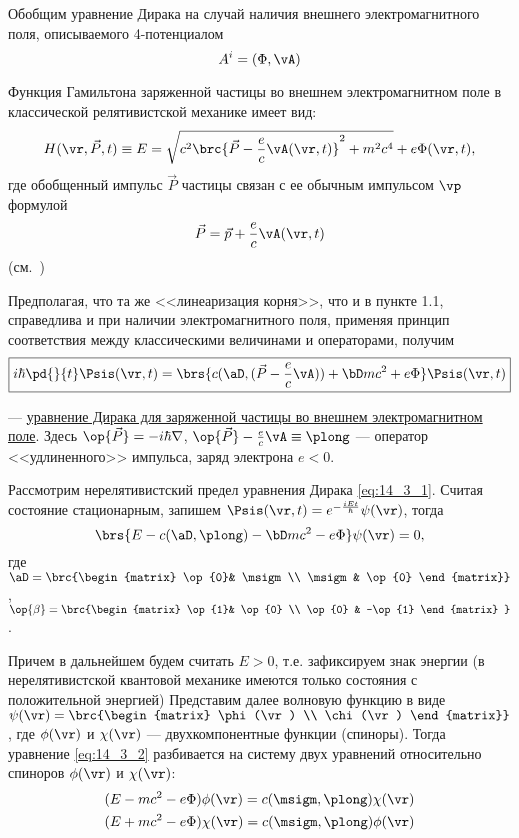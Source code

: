 Обобщим уравнение Дирака на случай наличия внешнего электромагнитного поля, описываемого 4-потенциалом
$$
A^i=(\Phi, \vA)
$$

Функция Гамильтона заряженной частицы во внешнем электромагнитном поле в классической релятивистской механике имеет вид:
$$
H(\vr, \vec{P}, t) \equiv E = \sqrt{c^2\brc{\vec{P} - \frac{e}{c}\vA(\vr, t)}^2 + m^2c^4} + e\Phi(\vr, t),
$$
где обобщенный импульс $\vec{P}$ частицы связан с ее обычным импульсом $\vp$ формулой
$$
\vec{P} = \vec{p} + \frac{e}{c}\vA(\vr, t)
$$
(см.~)

Предполагая, что та же <<линеаризация корня>>, что и в пункте 1.1, справедлива и при наличии электромагнитного поля, применяя принцип соответствия между классическими величинами и операторами, получим  
\begin{equation}
\label{eq:14_3_1}
\boxed{i \hbar \pd{}{t} \Psis(\vr, t) = \brs{c(\aD, (\vec{P} - \frac{e}{c} \vA)) + \bD mc^2 + e\Phi} \Psis(\vr, t)}
\end{equation}

--- \underline{уравнение Дирака для заряженной частицы во внешнем электромагнитном поле}. Здесь $\op{\vec{P}} = - i \hbar \nabla$, $\op{\vec{P}} - \frac{e}{c} \vA \equiv \plong$ --- оператор <<удлиненного>> импульса, заряд электрона $e < 0$.

Рассмотрим нерелятивистский предел уравнения Дирака \eqref{eq:14_3_1}. Считая состояние стационарным, запишем $\Psis(\vr, t) = e^{-\frac{iEt}{\hbar}} \psi(\vr)$, тогда
\begin{equation}
\label{eq:14_3_2}
\brs{E - c(\aD, \plong) - \bD mc^2 - e\Phi} \psi(\vr) = 0,
\end{equation}
где $\aD = \brc{\begin{matrix} \op{0}& \msigm \\ \msigm &  \op{0} \end{matrix}}$ , $\op{\beta} = \brc{\begin{matrix} \op{1}& \op{0} \\ \op{0} &  -\op{1} \end{matrix} }$.

Причем в дальнейшем будем считать $E>0$, т.е. зафиксируем знак энергии (в нерелятивистской квантовой механике имеются только состояния с положительной энергией) Представим далее волновую функцию в виде $\psi(\vr) = \brc{\begin{matrix} \phi(\vr) \\ \chi(\vr) \end{matrix}}$, где $\phi(\vr)$ и $\chi(\vr)$ --- двухкомпонентные функции (спиноры). Тогда уравнение \eqref{eq:14_3_2} разбивается на систему двух уравнений относительно спиноров $\phi(\vr)$ и $\chi(\vr)$:
\begin{gather}
\label{eq:14_3_3}
(E - mc^2 - e\Phi) \phi(\vr) = c(\msigm, \plong) \chi(\vr) \\
(E + mc^2 - e\Phi) \chi(\vr) = c(\msigm, \plong) \phi(\vr) \nonumber
\end{gather}
 
